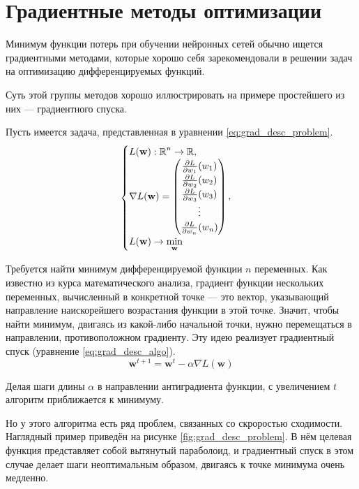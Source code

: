 \section{Градиентные методы оптимизации}

Минимум функции потерь при обучении нейронных сетей обычно ищется градиентными методами, которые хорошо себя зарекомендовали в решении задач на оптимизацию дифференцируемых функций.

Суть этой группы методов хорошо иллюстрировать на примере простейшего из них --- градиентного спуска.

Пусть имеется задача, представленная в уравнении \ref*{eq:grad_desc_problem}.
\begin{equation}
    \label{eq:grad_desc_problem}
    \begin{cases}
        L(\mathbf{w}): \operatorname{\mathbb{R}}^n \rightarrow \operatorname{\mathbb{R}}, \\
        \nabla L(\mathbf{w}) = \left(\begin{matrix}
            \frac{\partial L}{\partial w_1}(w_1) \\
            \frac{\partial L}{\partial w_2}(w_2) \\
            \frac{\partial L}{\partial w_3}(w_3) \\
            \vdots \\
            \frac{\partial L}{\partial w_n}(w_n)
        \end{matrix}\right), \\
        L(\mathbf{w}) \rightarrow \min\limits_\mathbf{w}
    \end{cases}
\end{equation}

Требуется найти минимум дифференцируемой функции $n$ переменных. Как известно из курса математического анализа, градиент функции нескольких переменных, вычисленный в конкретной точке --- это вектор, указывающий направление наискорейшего возрастания функции в этой точке. Значит, чтобы найти минимум, двигаясь из какой-либо начальной точки, нужно перемещаться в направлении, противоположном градиенту. Эту идею реализует градиентный спуск (уравнение \ref*{eq:grad_desc_algo}).
\begin{equation}
    \label{eq:grad_desc_algo}
    \mathbf{w}^{t+1}=\mathbf{w}^t-\alpha\nabla L(\mathbf{w})
\end{equation}

Делая шаги длины $\alpha$ в направлении антиградиента функции, с увеличением $t$ алгоритм приближается к минимуму.

Но у этого алгоритма есть ряд проблем, связанных со скроростью сходимости. Наглядный пример приведён на рисунке \ref*{fig:grad_desc_problem}. В нём целевая функция представляет собой вытянутый параболоид, и градиентный спуск в этом случае делает шаги неоптимальным образом, двигаясь к точке минимума очень медленно.

